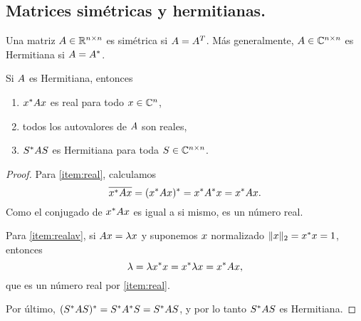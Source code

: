 



\subsection{Matrices simétricas y hermitianas.} Una matriz $\Ab \in \Rnn$ es simétrica si $\Ab = \Ab^T$. Más generalmente, $\Ab \in \Cnn$ es Hermitiana si $\Ab = \Ab^*$.

\begin{prop}
Si $\Ab$ es Hermitiana, entonces
\begin{enumerate}
\item \label{item:real} $\xb^* \Ab \xb$ es real para todo $\xb \in \Cn$,
\item \label{item:realav} todos los autovalores de $\Ab$ son reales,
\item $\Sb^* \Ab \Sb$ es Hermitiana para toda $\Sb \in \Cnn$.
\end{enumerate}
\end{prop}

\begin{proof}
Para \ref{item:real}, calculamos
$$
\overline{\xb^* \Ab \xb} = (\xb^* \Ab \xb)^* = \xb^* \Ab^* \xb = \xb^* \Ab \xb.
$$
Como el conjugado de $\xb^* \Ab \xb$ es igual a si mismo, es un n\'umero real.

Para \ref{item:realav}, si $\Ab \xb = \lambda \xb$ y suponemos $\xb$ normalizado $\|\xb\|_2 = \xb^* \xb = 1$, entonces
$$\lambda = \lambda \xb^* \xb = \xb^* \lambda  \xb =  \xb^* \Ab  \xb,$$
que es un n\'umero real por \ref{item:real}.

Por \'ultimo, $(\Sb^* \Ab \Sb)^* = \Sb^* \Ab^* \Sb = \Sb^* \Ab \Sb$, y por lo tanto $\Sb^* \Ab \Sb$ es Hermitiana.
\end{proof}

